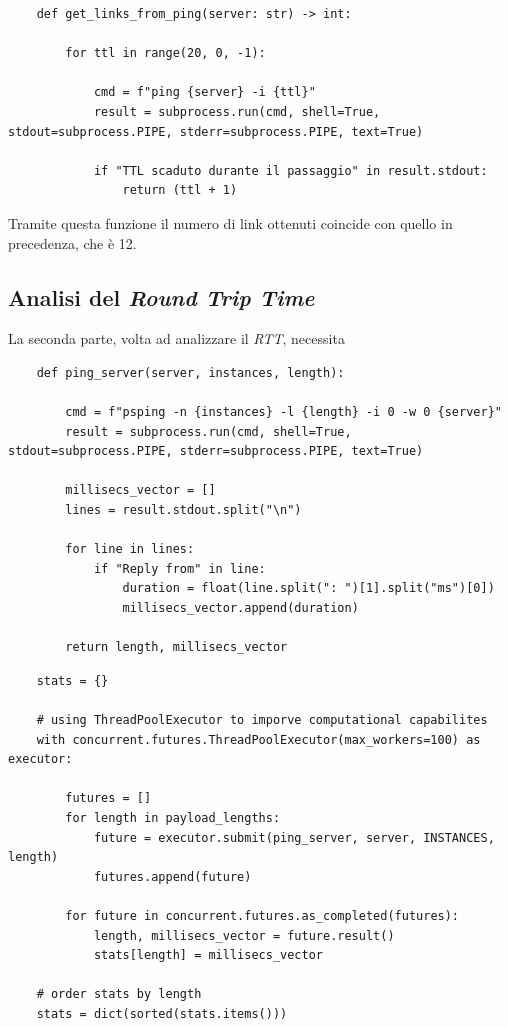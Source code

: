 \begin{lstlisting}
    def get_links_from_ping(server: str) -> int:

        for ttl in range(20, 0, -1):

            cmd = f"ping {server} -i {ttl}"
            result = subprocess.run(cmd, shell=True, stdout=subprocess.PIPE, stderr=subprocess.PIPE, text=True)

            if "TTL scaduto durante il passaggio" in result.stdout:
                return (ttl + 1)
\end{lstlisting}

\noindent Tramite questa funzione il numero di link ottenuti coincide con quello in precedenza, che è 12.


\vspace{15px}\subsection{Analisi del \textsl{Round Trip Time}}

La seconda parte, volta ad analizzare il \textsl{RTT}, necessita 


\begin{lstlisting}
    def ping_server(server, instances, length):

        cmd = f"psping -n {instances} -l {length} -i 0 -w 0 {server}"
        result = subprocess.run(cmd, shell=True, stdout=subprocess.PIPE, stderr=subprocess.PIPE, text=True)

        millisecs_vector = []
        lines = result.stdout.split("\n")
        
        for line in lines:
            if "Reply from" in line:
                duration = float(line.split(": ")[1].split("ms")[0])
                millisecs_vector.append(duration)
        
        return length, millisecs_vector
\end{lstlisting}


\begin{lstlisting}
    stats = {}
    
    # using ThreadPoolExecutor to imporve computational capabilites
    with concurrent.futures.ThreadPoolExecutor(max_workers=100) as executor:
        
        futures = []
        for length in payload_lengths:
            future = executor.submit(ping_server, server, INSTANCES, length)
            futures.append(future)
        
        for future in concurrent.futures.as_completed(futures):
            length, millisecs_vector = future.result()
            stats[length] = millisecs_vector
    
    # order stats by length
    stats = dict(sorted(stats.items()))
\end{lstlisting}



